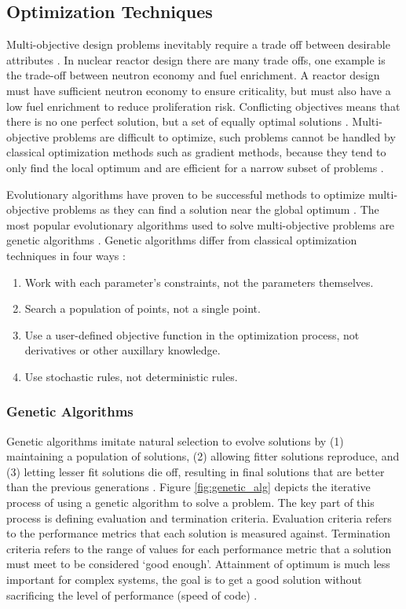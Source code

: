 \documentclass[letterpaper,11pt]{article}
\begin{document}
\subsection{Optimization Techniques}
Multi-objective design problems inevitably require a trade off between 
desirable attributes \cite{byrne_evolving_2014,simon_sciences_2019}. 
In nuclear reactor design there are many trade offs, one example is the 
trade-off between neutron economy and fuel enrichment. 
A reactor design must have sufficient neutron economy to ensure criticality, 
but must also have a low fuel enrichment to reduce proliferation risk.
Conflicting objectives means that there is no one perfect solution, but a set
of equally optimal solutions \cite{byrne_evolving_2014}.
Multi-objective problems are difficult to optimize, such problems 
cannot be handled by classical optimization methods such as gradient 
methods, because they tend to only find the local optimum 
\cite{renner_genetic_2003} and are efficient for a narrow subset 
of problems \cite{zames_genetic_1981}. 

Evolutionary algorithms have proven to be successful 
methods to optimize multi-objective problems \cite{krish_practical_2011} as 
they can find a solution near the global optimum \cite{renner_genetic_2003}. 
The most popular evolutionary algorithms used to solve multi-objective 
problems are genetic algorithms 
\cite{byrne_evolving_2014, krish_practical_2011}. 
Genetic algorithms differ from classical optimization techniques in four ways 
\cite{zames_genetic_1981}: 
\begin{enumerate}
        \item Work with each parameter's constraints, not
        the parameters themselves. 
        \item Search a population of points, not a single point. 
        \item Use a user-defined objective function in the 
        optimization process, not derivatives or other auxillary knowledge. 
        \item Use stochastic rules, not deterministic rules. 
\end{enumerate}

\subsubsection{Genetic Algorithms}
Genetic algorithms imitate natural selection to evolve solutions 
by (1) maintaining a population of solutions, (2) allowing 
fitter solutions reproduce, and (3) letting lesser fit solutions die off, 
resulting in final solutions that are better than the previous generations 
\cite{renner_genetic_2003}. 
Figure \ref{fig:genetic_alg} depicts the iterative process of using a genetic 
algorithm to solve a problem. 
The key part of this process is defining evaluation and termination criteria. 
Evaluation criteria refers to the performance metrics that each solution is 
measured against. 
Termination criteria refers to the range of values for each performance metric
that a solution must meet to be considered `good enough'. 
Attainment of optimum is much less important for complex systems, the goal is 
to get a good solution without sacrificing the level of performance (speed of 
code) \cite{zames_genetic_1981}. 
\end{document}
